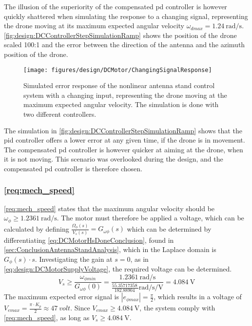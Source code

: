 The illusion of the superiority of the compensated \gls{pd} controller is however quickly shattered when simulating the response to a changing signal, representing the drone moving at its maximum expected angular velocity $\omega_{dmax} = \SI{1.24}{\radian\per\second}$. \autoref{fig:design:DCControllerStepSimulationRamp} shows the position of the drone scaled 100:1 and the error between the direction of the antenna and the azimuth position of the drone.
\begin{figure}[h!]
\centering
\texttt{[image: figures/design/DCMotor/ChangingSignalResponse]}
\caption{Simulated error response of the nonlinear antenna stand control system with a changing input, representing the drone moving at the maximum expected angular velocity. The simulation is done with two different controllers.}\label{fig:design:DCControllerStepSimulationRamp}
\end{figure}

The simulation in \autoref{fig:design:DCControllerStepSimulationRamp} shows that the \gls{pid} controller offers a lower error at any given time, if the drone is in movement. The compensated \gls{pd} controller is however quicker at aiming at the drone, when it is not moving. This scenario was overlooked during the design, and the compensated \gls{pd} controller is therefore chosen.

\subsubsection{\autoref{req:mech_speed}}
\autoref{req:mech_speed} states that the maximum angular velocity should  be $\omega_\phi \geq \SI{1.2361}{\radian\per\second}$. The motor must therefore be applied a voltage, which can be calculated by defining $\frac{\Omega_\phi(s)}{V_s(s)}= G_{\omega\phi}(s)$ which can be determined by differentiating \autoref{eq:DCMotorHsDoneConclusion}, found in \autoref{sec:ConclusionAntennaStandAnalysis}, which in the Laplace domain is $G_{\phi}(s)\cdot s$. Investigating the gain at $s= 0$, as in \autoref{eq:design:DCMotorSupplyVoltage}, the required voltage can be determined.
\begin{equation}\label{eq:design:DCMotorSupplyVoltage}
	V_{s} \geq \frac{\omega_{\phi min}}{G_{\omega\phi}(0)} = \frac{\SI{1.2361}{\radian\per\second}}{\frac{\SI{55.35717358}{}}{\SI{182.88904}{}} \si{\radian\per\second\per\volt}} = \SI{4.084}{\volt}
\end{equation}
\startexplain
{}
\stopexplain
The maximum expected error signal is $|e_{\phi max}| = \frac{\pi}{2}$, which results in a voltage of $V_{emax}=\frac{\pi \cdot K_p}{2} \approx \SI{47}{volt}$. Since $V_{emax} \geq \SI{4.084}{\volt}$, the system comply with \autoref{req:mech_speed}, as long as $V_{s} \geq \SI{4.084}{\volt}$.


